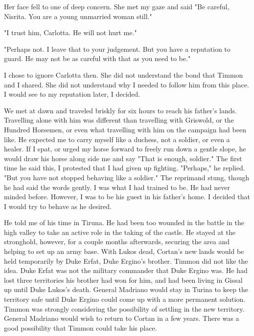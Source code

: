 \documentclass{article}
\begin{document}
Her face fell to one of deep concern. She met my gaze and said "Be careful, Nisrita. You are a young unmarried woman still."

"I trust him, Carlotta. He will not hurt me."

"Perhaps not. I leave that to your judgement. But you have a reputation to guard. He may not be as careful with that as you need to be."

I chose to ignore Carlotta then. She did not understand the bond that Timmon and I shared. She did not understand why I needed to follow him from this place. I would see to my reputation later, I decided.

\vspace{.5cm}

We met at dawn and traveled briskly for six hours to reach his father's lands. Travelling alone with him was different than travelling with Griswold, or the Hundred Horsemen, or even what travelling with him on the campaign had been like. He expected me to carry myself like a duchess, not a soldier, or even a healer. If I spat, or urged my horse forward to freely run down a gentle slope, he would draw his horse along side me and say "That is enough, soldier." The first time he said this, I protested that I had given up fighting. "Perhaps," he replied. "But you have not stopped behaving like a soldier." The reprimand stung, though he had said the words gently. I was what I had trained to be. He had never minded before. However, I was to be his guest in his father's home. I decided that I would try to behave as he desired.

He told me of his time in Tiruna. He had been too wounded in the battle in the high valley to take an active role in the taking of the castle. He stayed at the stronghold, however, for a couple months afterwards, securing the area and helping to set up an army base. With Lukos dead, Cortan's new lands would be held temporarily by Duke Erfat, Duke Ergino's brother. Timmon did not like the idea. Duke Erfat was not the military commander that Duke Ergino was. He had lost three territories his brother had won for him, and had been living in Gissal up until Duke Lukos's death. General Madriano would stay in Turina to keep the territory safe until Duke Ergino could come up with a more permanent solution. Timmon was strongly considering the possibility of settling in the new territory. General Madriano would wish to return to Cortan in a few years. There was a good possibility that Timmon could take his place. 
\end{document}
